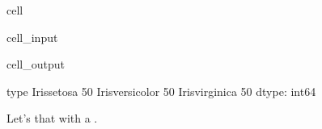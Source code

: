 \documentclass[letterpaper,10pt,english]{jupyterBook}
\begin{document}
\begin{sphinxuseclass}{cell}\begin{sphinxVerbatimInput}

\begin{sphinxuseclass}{cell_input}
\begin{sphinxVerbatim}[commandchars=\\\{\}]
  
\end{sphinxVerbatim}

\end{sphinxuseclass}\end{sphinxVerbatimInput}
\begin{sphinxVerbatimOutput}

\begin{sphinxuseclass}{cell_output}
\begin{sphinxVerbatim}[commandchars=\\\{\}]
type
Iris\PYGZhy{}setosa        50
Iris\PYGZhy{}versicolor    50
Iris\PYGZhy{}virginica     50
dtype: int64
\end{sphinxVerbatim}

\end{sphinxuseclass}\end{sphinxVerbatimOutput}

\end{sphinxuseclass}\label{\detokenize{task2_c/example_sup_class/sup_class_ex-process:sup-class-ex-descriptive-visuals}}
\sphinxAtStartPar
Let’s  that with a .
\end{document}
